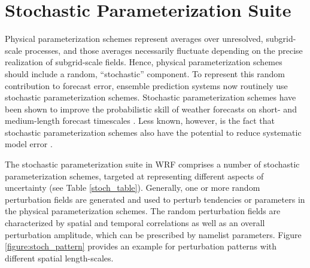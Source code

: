 \chapter{Stochastic Parameterization Suite}
\label{stoch_chap}

Physical parameterization schemes represent averages over unresolved,
subgrid-scale processes, and those averages necessarily 
fluctuate depending on the precise realization of subgrid-scale
fields.  Hence, physical parameterization schemes should include a random,
``stochastic'' component.  To represent this random contribution to
forecast error, ensemble prediction systems now routinely use stochastic
parameterization schemes.
Stochastic parameterization schemes have been shown to improve the
probabilistic skill of weather forecasts on short- and medium-length forecast
timescales 
\citep[e.g.][]{Be09,Be11,leutbecher2017stochastic}.
Less known, however, is the fact that stochastic parameterization schemes also have the
potential to reduce systematic model error 
\citep[e.g.][]{berner2017stochastic}.

The stochastic parameterization suite in WRF comprises a number of
stochastic parameterization schemes, targeted at representing different aspects 
of uncertainty (see Table \ref {stoch_table}). Generally, one or more random
perturbation fields are generated and used to perturb tendencies or
parameters in the physical parameterization schemes.
The random perturbation fields are characterized by spatial and temporal
correlations as well as an overall perturbation amplitude, which can be
prescribed by namelist parameters. Figure \ref{figure:stoch_pattern}
provides an example for perturbation patterns with different spatial length-scales.

